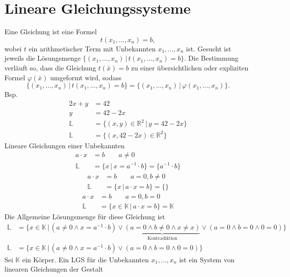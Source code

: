 \documentclass[a4paper,12pt]{article}
\begin{document}
\section{Lineare Gleichungssysteme}
Eine Gleichung ist eine Formel
\[ 
        t\left(x_1,\hdots,x_n\right)=b
,\] 
wobei $t$ ein arithmetischer Term mit Unbekannten $x_1,\hdots,x_n$ ist. Gesucht ist jeweils die Lösungsmenge $\{\left(x_1,\hdots,x_n\right)\,|\, t\left(x_1,\hdots,x_n\right)=b\}$. Die Bestimmung verläuft so, dass die Gleichung $t\left(\bar{x}\right)=b$ zu einer übersichtlichen oder expliziten Formel $\varphi \left(\bar{x}\right)$ umgeformt wird, sodass
\[ 
        \{\left(x_1,\hdots,x_n\right)\,|\, t\left(x_1,\hdots,x_n\right)=b\}=\{\left(x_1,\hdots,x_n\right)\,|\, \varphi \left(x_1,\hdots,x_n\right)\}
.\] 
Bsp.
\begin{align*}
        2x+y&=42\\
        y&=42-2x\\
        \mathbb{L}&=\{\left(x,y\right) \in \mathbb{R}^2\,|\, y=42-2x\}\\
        \mathbb{L}&=\{\left(x,42-2x\right) \in \mathbb{R}^2\}
\end{align*}
Lineare Gleichungen einer Unbekannten
\begin{align*}
        a\cdot x&=b\qquad a\neq 0\\
        \mathbb{L}&=\{x\,|\, x=a^{-1}\cdot b\}=\{a^{-1}\cdot b\}
\end{align*}
\begin{align*}
        a\cdot x&=b\qquad a=0,b\neq 0\\
        \mathbb{L}&=\{x\,|\, a\cdot x=b\}=\{\}
\end{align*}
\begin{align*}
        a\cdot x&=b\qquad a=0,b=0\\
        \mathbb{L}&=\{x \in \mathbb{K}\,|\, a\cdot x=b\}=\mathbb{K}
\end{align*}
Die Allgemeine Lösungsmenge für diese Gleichung ist
\begin{align*}
        \mathbb{L}&=\{x \in \mathbb{K}\,|\, \left(a\neq 0\land x=a^{-1}\cdot b\right)\lor \underbrace{\left(a=0\land b\neq 0\land x\neq x\right)}_{\text{Kontradiktion}}\lor \left(a=0\land b=0\land 0=0\right)\}\\
        \mathbb{L}&=\{x \in \mathbb{K}\,|\, \left(a\neq 0\land x=a^{-1}\cdot b\right)\lor \left(a=0\land b=0\land 0=0\right)\}
\end{align*}
Sei $\mathbb{K}$ ein Körper. Ein LGS für die Unbekannten $x_1,\hdots,x_n$ ist ein System von linearen Gleichungen der Gestalt
\end{document}
